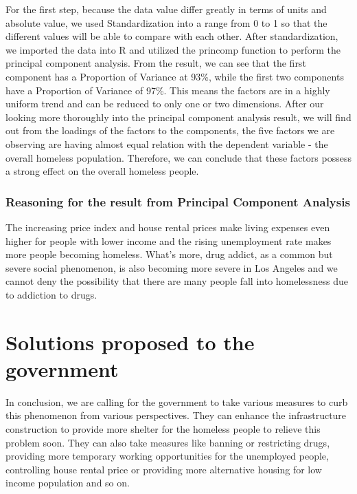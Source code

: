 \documentclass[]{article}
\begin{document}
For the first step, because the data value differ greatly in terms of
units and absolute value, we used Standardization into a range from 0 to
1 so that the different values will be able to compare with each other.
After standardization, we imported the data into R and utilized the
princomp function to perform the principal component analysis. From the
result, we can see that the first component has a Proportion of Variance
at 93\%, while the first two components have a Proportion of Variance of
97\%. This means the factors are in a highly uniform trend and can be
reduced to only one or two dimensions. After our looking more thoroughly
into the principal component analysis result, we will find out from the
loadings of the factors to the components, the five factors we are
observing are having almost equal relation with the dependent variable -
the overall homeless population. Therefore, we can conclude that these
factors possess a strong effect on the overall homeless people.

\hypertarget{reasoning-for-the-result-from-principal-component-analysis}{%
\subsubsection{Reasoning for the result from Principal Component
Analysis}\label{reasoning-for-the-result-from-principal-component-analysis}}

The increasing price index and house rental prices make living expenses
even higher for people with lower income and the rising unemployment
rate makes more people becoming homeless. What's more, drug addict, as a
common but severe social phenomenon, is also becoming more severe in Los
Angeles and we cannot deny the possibility that there are many people
fall into homelessness due to addiction to drugs.

\hypertarget{solutions-proposed-to-the-government}{%
\section{Solutions proposed to the
government}\label{solutions-proposed-to-the-government}}

In conclusion, we are calling for the government to take various
measures to curb this phenomenon from various perspectives. They can
enhance the infrastructure construction to provide more shelter for the
homeless people to relieve this problem soon. They can also take
measures like banning or restricting drugs, providing more temporary
working opportunities for the unemployed people, controlling house
rental price or providing more alternative housing for low income
population and so on.
\end{document}
